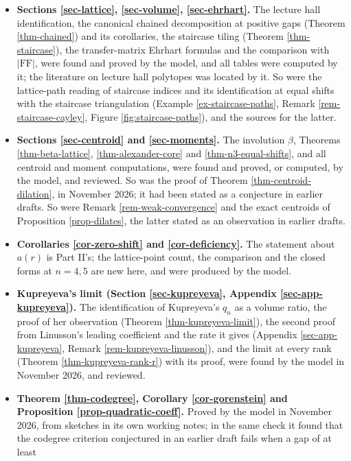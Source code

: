 \documentclass[11pt, a4paper, abstract=yes]{scrartcl}
\theoremstyle{definition}
\theoremstyle{remark}
\theoremstyle{plain}
\theoremstyle{remark}
\theoremstyle{plain}
\newcommand{\FF}{\mathrm{FF}}
\begin{document}
\begin{itemize}
\item \textbf{Sections \ref{sec-lattice}, \ref{sec-volume}, \ref{sec-ehrhart}.} The lecture hall identification, the
canonical chained decomposition at positive gaps (Theorem \ref{thm-chained}) and its corollaries, the
staircase tiling (Theorem \ref{thm-staircase}), the transfer-matrix Ehrhart formulas and the comparison
with \(\lvert\FF\rvert\), were found and proved by the model, and all tables were computed by it;
the literature on lecture hall polytopes was located by it. So were the lattice-path reading of
staircase indices and its identification at equal shifts with the staircase triangulation
(Example \ref{ex-staircase-paths}, Remark \ref{rem-staircase-cayley}, Figure \ref{fig:staircase-paths}),
and the sources for the latter.
\item \textbf{Sections \ref{sec-centroid} and \ref{sec-moments}.} The involution \(\beta\), Theorems
\ref{thm-beta-lattice}, \ref{thm-alexander-core} and \ref{thm-n3-equal-shifts}, and all centroid and moment
computations, were found and proved, or computed, by the model, and reviewed. So was the proof of
Theorem \ref{thm-centroid-dilation}, in November 2026; it had been stated as a conjecture in earlier
drafts. So were Remark \ref{rem-weak-convergence} and the exact centroids of
Proposition \ref{prop-dilates}, the latter stated as an observation in earlier drafts.
\item \textbf{Corollaries \ref{cor-zero-shift} and \ref{cor-deficiency}.} The statement about \(a(r)\) is Part II's; the
lattice-point count, the comparison and the closed forms at \(n=4,5\) are new here, and were
produced by the model.
\item \textbf{Kupreyeva's limit (Section \ref{sec-kupreyeva}, Appendix \ref{sec-app-kupreyeva}).} The
identification of Kupreyeva's \(q_n\) as a volume ratio, the proof of her observation
(Theorem \ref{thm-kupreyeva-limit}), the second proof from Linusson's leading coefficient and the rate
it gives (Appendix \ref{sec-app-kupreyeva}, Remark \ref{rem-kupreyeva-linusson}), and the limit at every rank
(Theorem \ref{thm-kupreyeva-rank-r}) with its proof, were found by the model in November 2026, and
reviewed.
\item \textbf{Theorem \ref{thm-codegree}, Corollary \ref{cor-gorenstein} and Proposition \ref{prop-quadratic-coeff}.}
Proved by the model in November 2026, from sketches in its own working notes; in the same check it
found that the codegree criterion conjectured in an earlier draft fails when a gap of at least

\end{itemize}
\end{document}
